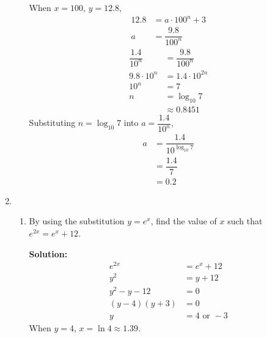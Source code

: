 \documentclass{report}
\newcommand{\sol}{\vspace{0.2cm}\textbf{Solution:}\vspace{0.2cm}}
\begin{document}
\begin{multicols*}{2}
\begin{enumerate}[leftmargin=*]
\begin{enumerate}
                        When $x=100$, $y=12.8$,
                        \begin{align*}
                            12.8 & = a \cdot 100^n + 3  \\
                            a    & = \dfrac{9.8}{100^n}
                        \end{align*}
                        \begin{align*}
                            \dfrac{1.4}{10^n} & = \dfrac{9.8}{100^n} \\
                            9.8 \cdot 10^n    & = 1.4 \cdot 10^{2n}  \\
                            10^n              & = 7                  \\
                            n                 & = \log_{10} 7        \\
                                              & \approx 0.8451
                        \end{align*}
                        Substituting $n=\log_{10} 7$ into $a = \dfrac{1.4}{10^n}$,
                        \begin{align*}
                            a & = \dfrac{1.4}{10^{\log_{10} 7}} \\
                              & = \dfrac{1.4}{7}                \\
                              & = 0.2
                        \end{align*}
              \end{enumerate}

              \item\begin{enumerate}
                  \item By using the substitution $y=e^x$, find the value of $x$ such that $e^{2
                                    x}=e^{x}+12$.

                        \sol{}
                        \begin{align*}
                            e^{2x}         & = e^x + 12         \\
                            y^2            & = y + 12           \\
                            y^2 - y - 12   & = 0                \\
                            (y - 4)(y + 3) & = 0                \\
                            y              & = 4 \text{ or } -3
                        \end{align*}
                        When $y = 4$, $x = \ln 4 \approx 1.39$.


\end{enumerate}
\end{enumerate}
\end{multicols*}
\end{document}
